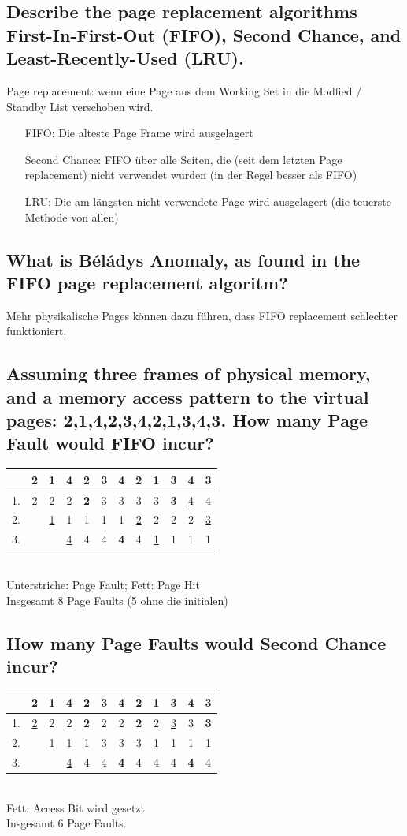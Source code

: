 \subsection{Describe the page replacement algorithms First-In-First-Out (FIFO), Second Chance, and Least-Recently-Used (LRU).}
Page replacement: wenn eine Page aus dem Working Set in die Modfied / Standby List verschoben wird.\\
\begin{itemize}
    \item[FIFO:] Die alteste Page Frame wird ausgelagert
    \item[Second Chance:] FIFO über alle Seiten, die (seit dem letzten Page replacement) nicht verwendet wurden (in der Regel besser als FIFO)
    \item[LRU:] Die am längsten nicht verwendete Page wird ausgelagert (die teuerste Methode von allen)
\end{itemize}

\subsection{What is Béládys Anomaly, as found in the FIFO page replacement algoritm?}
Mehr physikalische Pages können dazu führen, dass FIFO replacement schlechter funktioniert.

\subsection{Assuming three frames of physical memory, and a memory access pattern to the virtual pages: 2,1,4,2,3,4,2,1,3,4,3. How many Page Fault would FIFO incur?}
\begin{tabular}{c|ccccccccccc}
    &2&1&4&2&3&4&2&1&3&4&3\\
    \hline
    1.&\underline{2}&2&2&\textbf{2}&\underline{3}&3&3&3&\textbf{3}&\underline{4}&4\\
    2.& &\underline{1}&1&1&1&1&\underline{2}&2&2&2&\underline{3}\\
    3.& & &\underline{4}&4&4&\textbf{4}&4&\underline{1}&1&1&1
\end{tabular}
\\
Unterstriche: Page Fault; Fett: Page Hit\\
Insgesamt 8 Page Faults (5 ohne die initialen)

\subsection{How many Page Faults would Second Chance incur?}
\begin{tabular}{c|ccccccccccc}
      &2&1&4&2&3&4&2&1&3&4&3\\
    \hline
    1.&\underline{2}&2&2&\textbf{2}&2&2&\textbf{2}&2&\underline{3}&3&\textbf{3}\\
    2.& &\underline{1}&1&1&\underline{3}&3&3&\underline{1}&1&1&1\\
    3.& & &\underline{4}&4&4&\textbf{4}&4&4&4&\textbf{4}&4
\end{tabular}
\\
Fett: Access Bit wird gesetzt\\
Insgesamt 6 Page Faults.

